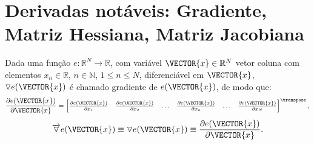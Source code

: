
\section{Derivadas notáveis: Gradiente, Matriz Hessiana, Matriz Jacobiana}

\begin{proposition}\label{def:gradient}
 Dada uma função $e:\mathbb{R}^{N}\rightarrow \mathbb{R}$, com variável $\VECTOR{x} \in \mathbb{R}^{N}$
 vetor coluna com elementos $x_n\in \mathbb{R}$, $n\in \mathbb{N}$, $1 \leq n \leq N$,
 diferenciável em $\VECTOR{x}$, 
 $\triangledown e(\VECTOR{x})$ é chamado gradiente 
\cite[pp. 913]{stewart2008calculus} \cite[pp. 80]{telles2015matematica} \cite{Gradient}  de $e(\VECTOR{x})$, de modo que: 
\begin{equation}
\frac{\partial e(\VECTOR{x})}{\partial \VECTOR{x} }=
\left[
\begin{matrix}
\frac{\partial e(\VECTOR{x}) }{\partial x_{1}}&
\frac{\partial e(\VECTOR{x}) }{\partial x_{2}}&
\hdots&
\frac{\partial e(\VECTOR{x}) }{\partial x_{n}}&
\hdots&
\frac{\partial e(\VECTOR{x}) }{\partial x_{N}}
\end{matrix}
\right]^{\transpose},
 \end{equation}
\begin{equation}
\overrightarrow{\triangledown} e(\VECTOR{x})\equiv  
\triangledown e(\VECTOR{x}) \equiv 
\frac{\partial e(\VECTOR{x})}{\partial \VECTOR{x} }.
\end{equation}
\end{proposition}


